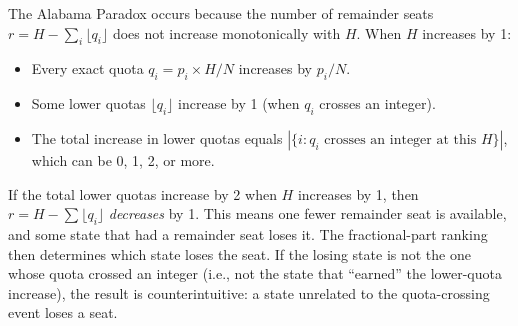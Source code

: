 The Alabama Paradox occurs because the number of remainder seats
$r = H - \sum_i \lfloor q_i \rfloor$ does not increase monotonically
with $H$.
When $H$ increases by 1:
\begin{itemize}
  \item Every exact quota $q_i = p_i \times H / N$ increases by $p_i/N$.
  \item Some lower quotas $\lfloor q_i \rfloor$ increase by 1
    (when $q_i$ crosses an integer).
  \item The total increase in lower quotas equals
    $|\{i : q_i \text{ crosses an integer at this } H\}|$,
    which can be 0, 1, 2, or more.
\end{itemize}
If the total lower quotas increase by 2 when $H$ increases by 1,
then $r = H - \sum \lfloor q_i \rfloor$ \emph{decreases} by 1.
This means one fewer remainder seat is available, and some state
that had a remainder seat loses it.
The fractional-part ranking then determines which state loses the seat.
If the losing state is not the one whose quota crossed an integer
(i.e., not the state that ``earned'' the lower-quota increase),
the result is counterintuitive: a state unrelated to the quota-crossing
event loses a seat.
